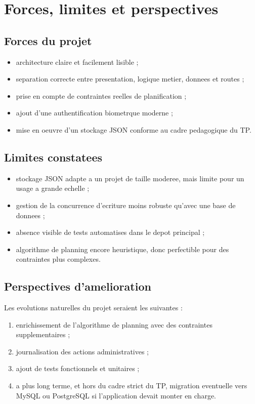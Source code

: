 \documentclass[12pt,a4paper]{article}
\begin{document}
\section{Forces, limites et perspectives}
\subsection{Forces du projet}
\begin{itemize}
    \item architecture claire et facilement lisible ;
    \item separation correcte entre presentation, logique metier, donnees et routes ;
    \item prise en compte de contraintes reelles de planification ;
    \item ajout d'une authentification biometrque moderne ;
    \item mise en oeuvre d'un stockage JSON conforme au cadre pedagogique du TP.
\end{itemize}

\subsection{Limites constatees}
\begin{itemize}
    \item stockage JSON adapte a un projet de taille moderee, mais limite pour un usage a grande echelle ;
    \item gestion de la concurrence d'ecriture moins robuste qu'avec une base de donnees ;
    \item absence visible de tests automatises dans le depot principal ;
    \item algorithme de planning encore heuristique, donc perfectible pour des contraintes plus complexes.
\end{itemize}

\subsection{Perspectives d'amelioration}
Les evolutions naturelles du projet seraient les suivantes :
\begin{enumerate}
    \item enrichissement de l'algorithme de planning avec des contraintes supplementaires ;
    \item journalisation des actions administratives ;
    \item ajout de tests fonctionnels et unitaires ;
    \item a plus long terme, et hors du cadre strict du TP, migration eventuelle vers MySQL ou PostgreSQL si l'application devait monter en charge.
\end{enumerate}
\end{document}
